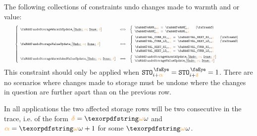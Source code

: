 The following collections of constraints undo changes made to warmth and or value:
\[
	\resizebox{.95\linewidth}{!}{$
	\left\{ \begin{array}{lcl}
		\stoUndoWarmthUpdate {i}{\reluo}{\reldo} & \iff &
		\left\{	\begin{array}{lclr}
			\stoWarmth    _{i + \reluo} & \!\!\! = \!\!\! & \stoWarmth\new_{i + \reldo} & \quad (\trash)             \\
			\stoWarmth\new_{i + \reluo} & \!\!\! = \!\!\! & \stoWarmth    _{i + \reldo}     \\
		\end{array}	\right.	\vspace{2mm}	\\
		\stoUndoValueUpdate {i}{\reluo}{\reldo} & \iff &
		\left\{	\begin{array}{lclr}
			\stoCurrValueHi_{i + \reluo} & \!\!\! = \!\!\! & \stoNextValueHi_{i + \reldo}  & \quad (\trash)             \\
			\stoCurrValueLo_{i + \reluo} & \!\!\! = \!\!\! & \stoNextValueLo_{i + \reldo}  & \quad (\trash)\vspace{2mm} \\
			\stoNextValueHi_{i + \reluo} & \!\!\! = \!\!\! & \stoCurrValueHi_{i + \reldo} \\
			\stoNextValueLo_{i + \reluo} & \!\!\! = \!\!\! & \stoCurrValueLo_{i + \reldo} \\
		\end{array}	\right.	\vspace{2mm}	\\
		\stoUndoWarmthAndValueUpdate {i}{\reluo}{\reldo} & \iff &
		\left\{	\begin{array}{lcl}
			\stoUndoWarmthUpdate {i}{\reluo}{\reldo} \\
			\stoUndoValueUpdate  {i}{\reluo}{\reldo} \\
		\end{array}	\right.	\\
	\end{array} \right.
	$}
\]
\saNote{}
This constraint should only be applied when $\peekStorage_{i + \reluo} = \peekStorage_{i + \reldo} = 1$.
There are no scenarios where changes made to storage must be undone where the changes in question are further apart than on the previous row.

\saNote{}
In all applications the two affected storage rows will be two consecutive in the trace, i.e. of the form $\reldo = \relof$ and $\reluo = \relof + 1$ for some $\relof$.
